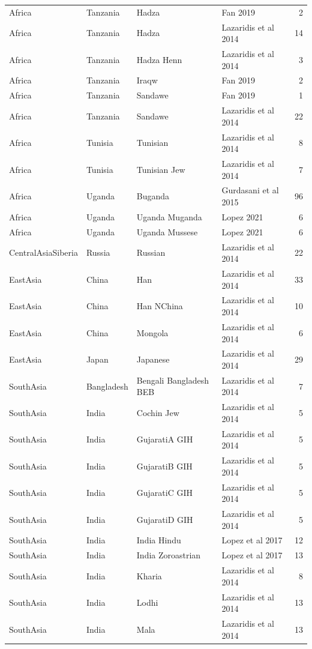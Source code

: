 \begin{longtable}[t]{lll>{\raggedright\arraybackslash}p{9em}r}
\addlinespace
Africa & Tanzania & Hadza & Fan 2019 & 2\\
Africa & Tanzania & Hadza & Lazaridis et al 2014 & 14\\
Africa & Tanzania & Hadza Henn & Lazaridis et al 2014 & 3\\
Africa & Tanzania & Iraqw & Fan 2019 & 2\\
Africa & Tanzania & Sandawe & Fan 2019 & 1\\
\addlinespace
Africa & Tanzania & Sandawe & Lazaridis et al 2014 & 22\\
Africa & Tunisia & Tunisian & Lazaridis et al 2014 & 8\\
Africa & Tunisia & Tunisian Jew & Lazaridis et al 2014 & 7\\
Africa & Uganda & Buganda & Gurdasani et al 2015 & 96\\
Africa & Uganda & Uganda Muganda & Lopez 2021 & 6\\
\addlinespace
Africa & Uganda & Uganda Mussese & Lopez 2021 & 6\\
CentralAsiaSiberia & Russia & Russian & Lazaridis et al 2014 & 22\\
EastAsia & China & Han & Lazaridis et al 2014 & 33\\
EastAsia & China & Han NChina & Lazaridis et al 2014 & 10\\
EastAsia & China & Mongola & Lazaridis et al 2014 & 6\\
\addlinespace
EastAsia & Japan & Japanese & Lazaridis et al 2014 & 29\\
SouthAsia & Bangladesh & Bengali Bangladesh BEB & Lazaridis et al 2014 & 7\\
SouthAsia & India & Cochin Jew & Lazaridis et al 2014 & 5\\
SouthAsia & India & GujaratiA GIH & Lazaridis et al 2014 & 5\\
SouthAsia & India & GujaratiB GIH & Lazaridis et al 2014 & 5\\
SouthAsia & India & GujaratiC GIH & Lazaridis et al 2014 & 5\\
SouthAsia & India & GujaratiD GIH & Lazaridis et al 2014 & 5\\
SouthAsia & India & India Hindu & Lopez et al 2017 & 12\\
SouthAsia & India & India Zoroastrian & Lopez et al 2017 & 13\\
SouthAsia & India & Kharia & Lazaridis et al 2014 & 8\\
SouthAsia & India & Lodhi & Lazaridis et al 2014 & 13\\
SouthAsia & India & Mala & Lazaridis et al 2014 & 13\\

\end{longtable}
